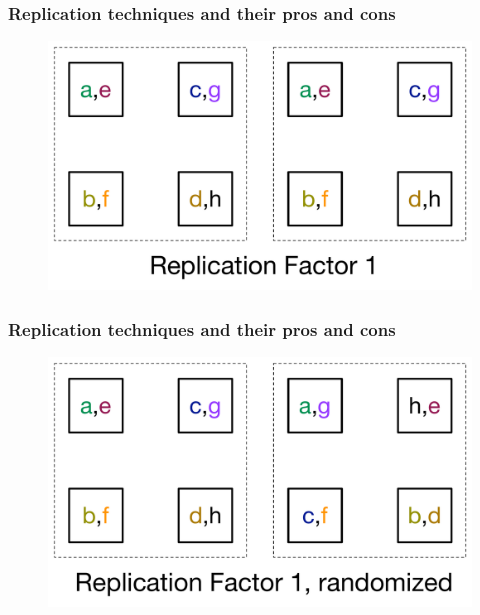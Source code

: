 \documentclass[aspectratio=43, unicode, notheorems, xcolor={dvipsnames}]{beamer}
\begin{document}
\begin{frame}
	\frametitle{Replication techniques and their pros and cons}
	\begin{figure}[h]
		\begin{center}
			\includegraphics[height=0.7\paperheight]{rf1}
		\end{center}
	\end{figure}
\end{frame}

\begin{frame}
	\frametitle{Replication techniques and their pros and cons}
	\begin{figure}[h]
		\begin{center}
			\includegraphics[height=0.7\paperheight]{rf1-rnd}
		\end{center}
	\end{figure}
\end{frame}
\end{document}
